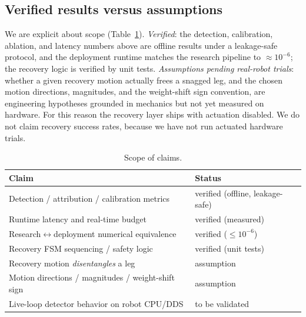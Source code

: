 \documentclass[conference]{IEEEtran}
\begin{document}
\subsection{Verified results versus assumptions}
We are explicit about scope (Table~\ref{tab:assumptions}). \emph{Verified}: the
detection, calibration, ablation, and latency numbers above are offline results under
a leakage-safe protocol, and the deployment runtime matches the research pipeline to
$\approx\!10^{-6}$; the recovery logic is verified by unit tests. \emph{Assumptions
pending real-robot trials}: whether a given recovery motion actually frees a snagged
leg, and the chosen motion directions, magnitudes, and the weight-shift sign
convention, are engineering hypotheses grounded in mechanics but not yet measured on
hardware. For this reason the recovery layer ships with actuation disabled. We do not
claim recovery success rates, because we have not run actuated hardware trials.

\begin{table}[t]
\centering
\caption{Scope of claims.}
\label{tab:assumptions}
\small
\begin{tabular}{@{}p{}p{}@{}}
\toprule
Claim & Status \\
\midrule
Detection / attribution / calibration metrics & verified (offline, leakage-safe) \\
Runtime latency and real-time budget & verified (measured) \\
Research$\leftrightarrow$deployment numerical equivalence & verified ($\le\!10^{-6}$) \\
Recovery FSM sequencing / safety logic & verified (unit tests) \\
Recovery motion \emph{disentangles} a leg & assumption \\
Motion directions / magnitudes / weight-shift sign & assumption \\
Live-loop detector behavior on robot CPU/DDS & to be validated \\
\bottomrule
\end{tabular}
\end{table}
\end{document}
